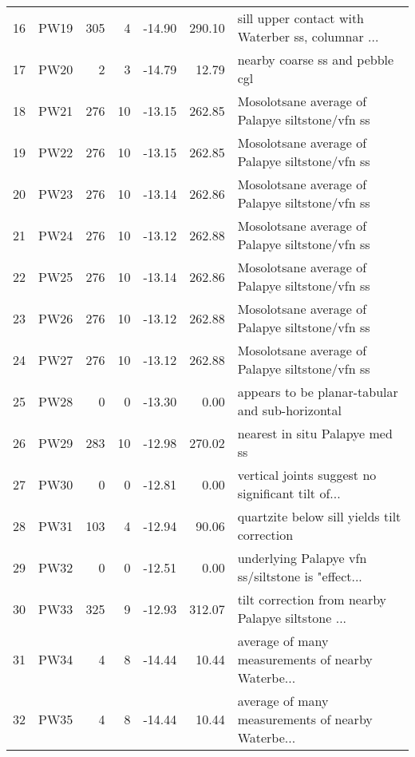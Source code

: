 \documentclass{article}
\begin{document}
{\begin{tabular}{llrrrrl}
16 &    PW19 &      305 &    4 &   -14.90 &       290.10 &  sill upper contact with Waterber ss, columnar ... \\
17 &    PW20 &        2 &    3 &   -14.79 &        12.79 &                    nearby coarse ss and pebble cgl \\
18 &    PW21 &      276 &   10 &   -13.15 &       262.85 &    Mosolotsane average of Palapye siltstone/vfn ss \\
19 &    PW22 &      276 &   10 &   -13.15 &       262.85 &    Mosolotsane average of Palapye siltstone/vfn ss \\
20 &    PW23 &      276 &   10 &   -13.14 &       262.86 &    Mosolotsane average of Palapye siltstone/vfn ss \\
21 &    PW24 &      276 &   10 &   -13.12 &       262.88 &    Mosolotsane average of Palapye siltstone/vfn ss \\
22 &    PW25 &      276 &   10 &   -13.14 &       262.86 &    Mosolotsane average of Palapye siltstone/vfn ss \\
23 &    PW26 &      276 &   10 &   -13.12 &       262.88 &    Mosolotsane average of Palapye siltstone/vfn ss \\
24 &    PW27 &      276 &   10 &   -13.12 &       262.88 &    Mosolotsane average of Palapye siltstone/vfn ss \\
25 &    PW28 &        0 &    0 &   -13.30 &         0.00 &    appears to be planar-tabular and sub-horizontal \\
26 &    PW29 &      283 &   10 &   -12.98 &       270.02 &                    nearest in situ Palapye med ss  \\
27 &    PW30 &        0 &    0 &   -12.81 &         0.00 &  vertical joints suggest no significant tilt of... \\
28 &    PW31 &      103 &    4 &   -12.94 &        90.06 &        quartzite below sill yields tilt correction \\
29 &    PW32 &        0 &    0 &   -12.51 &         0.00 &  underlying Palapye vfn ss/siltstone is "effect... \\
30 &    PW33 &      325 &    9 &   -12.93 &       312.07 &  tilt correction from nearby Palapye siltstone ... \\
31 &    PW34 &        4 &    8 &   -14.44 &        10.44 &  average of many measurements of nearby Waterbe... \\
32 &    PW35 &        4 &    8 &   -14.44 &        10.44 &  average of many measurements of nearby Waterbe... \\

\end{tabular}}
\end{document}
